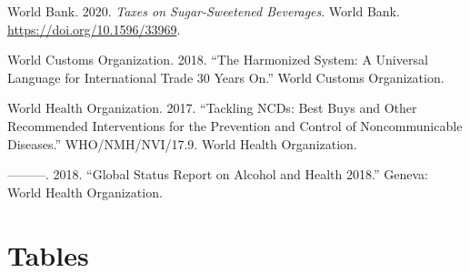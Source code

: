 \documentclass[
  11pt,
]{article}
\newlength{\cslhangindent}
\newenvironment{CSLReferences}[2] %
 {\begin{list}{}{%
  \setlength{\itemindent}{0pt}
  \setlength{\leftmargin}{0pt}
  \setlength{\parsep}{0pt}
  \ifodd #1
   \setlength{\leftmargin}{\cslhangindent}
   \setlength{\itemindent}{-1\cslhangindent}
  \fi
  \setlength{\itemsep}{#2\baselineskip}}}
 {\end{list}}
\begin{document}
\begin{CSLReferences}{1}{0}
World Bank. 2020. \emph{Taxes on Sugar-Sweetened Beverages}. World Bank.
\url{https://doi.org/10.1596/33969}.

World Customs Organization. 2018. {``The Harmonized System: A Universal
Language for International Trade 30 Years On.''} World Customs
Organization.

World Health Organization. 2017. {``Tackling {NCDs}: Best Buys and Other
Recommended Interventions for the Prevention and Control of
Noncommunicable Diseases.''} WHO/NMH/NVI/17.9. World Health
Organization.

---------. 2018. {``Global Status Report on Alcohol and Health 2018.''}
Geneva: World Health Organization.

\end{CSLReferences}

\clearpage
\appendix
\singlespacing

\section{Tables}\label{tables}
\end{document}
